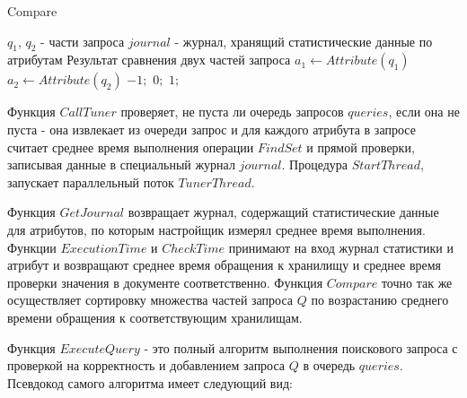 \documentclass{matmex-diploma}
\begin{document}
        \begin{algorithm}[H]                   
        \caption{Compare}              
        \label{cmp1}                        
            \begin{algorithmic}        
                \REQUIRE $q_1$, $q_2$ - части запроса $journal$ - журнал, хранящий статистические данные по атрибутам
                \ENSURE Результат сравнения двух частей запроса
                \STATE $a_1 \leftarrow Attribute(q_1)$
                \STATE $a_2 \leftarrow Attribute(q_2)$
                    \RETURN $-1;$
                \ELSE 
                        \RETURN $0;$
                    \ELSE
                        \RETURN $1;$
                    \ENDIF
                \ENDIF
            \end{algorithmic}
        \end{algorithm}
        
        Функция $CallTuner$ проверяет, не пуста ли очередь запросов $queries$, если она не пуста - она извлекает из очереди запрос и для каждого атрибута в запросе считает среднее время выполнения операции $FindSet$ и прямой проверки, записывая данные в специальный журнал $journal$. Процедура $StartThread$, запускает параллельный поток $TunerThread$.
        
        Функция $GetJournal$ возвращает журнал, содержащий статистические данные для атрибутов, по которым настройщик измерял среднее время выполнения. Функции $ExecutionTime$ и $CheckTime$ принимают на вход журнал статистики и атрибут и возвращают среднее время обращения к хранилищу и среднее время проверки значения в документе соответственно. Функция $Compare$ точно так же осуществляет сортировку множества частей запроса $Q$ по возрастанию среднего времени обращения к соответствующим хранилищам.
        
        Функция $ExecuteQuery$ - это полный алгоритм выполнения поискового запроса с проверкой на корректность и добавлением запроса $Q$ в очередь $queries$. Псевдокод самого алгоритма имеет следующий вид:
        
\end{document}
